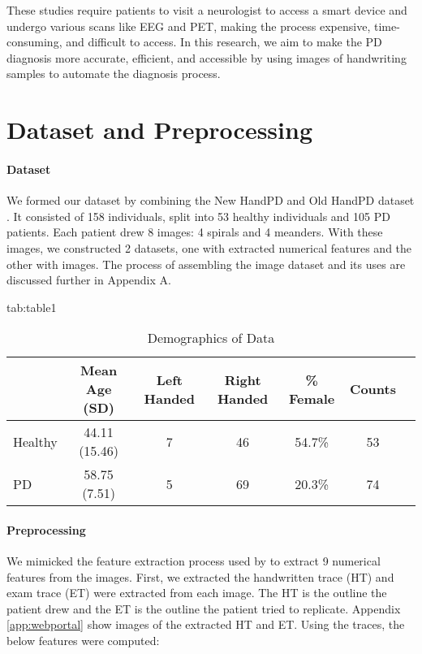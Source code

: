 \documentclass[pmlr,twocolumn,10pt]{jmlr} %
\begin{document}
These studies require patients to visit a neurologist to access a smart device and undergo various scans like EEG and PET, making the process expensive, time-consuming, and difficult to access. In this research, we aim to make the PD diagnosis more accurate, efficient, and accessible by using images of handwriting samples to automate the diagnosis process. 

\section{Dataset and Preprocessing}
\label{sec:Dataset+Preprocessing}

\paragraph{Dataset}
\label{sec:Dataset} We formed our dataset by combining the New HandPD and Old HandPD dataset \citep{pereira2016new}. It consisted of 158 individuals, split into 53 healthy individuals and 105 PD patients. Each patient drew 8 images: 4 spirals and 4 meanders. With these images, we constructed 2 datasets, one with extracted numerical features and the other with images. The process of assembling the image dataset and its uses are discussed further in Appendix A.

\begin{table*}[hbtp]
\centering 
\floatconts
{tab:table1}
{\caption{Demographics of Data}} 
    {
        \begin{tabular}{lcccccc}
        \toprule
        \bfseries & \bfseries Mean Age (SD) & \bfseries Left Handed & \bfseries Right Handed & \bfseries \% Female & \bfseries Counts \\
        \midrule
        Healthy & 44.11 (15.46) & 7 & 46 & 54.7\% & 53 \\
        PD & 58.75 (7.51) & 5 & 69 & 20.3\% & 74 \\
        \bottomrule
        \end{tabular}
    }
\end{table*}

\paragraph{Preprocessing}
\label{sec:Preprocessing} 
We mimicked the feature extraction process used by \citep{pereira2016new} to extract 9 numerical features from the images. First, we extracted the handwritten trace (HT) and exam trace (ET) were extracted from each image. The HT is the outline the patient drew and the ET is the outline the patient tried to replicate. Appendix \ref{app:webportal} show images of the extracted HT and ET. Using the traces, the below features were computed:
\end{document}
